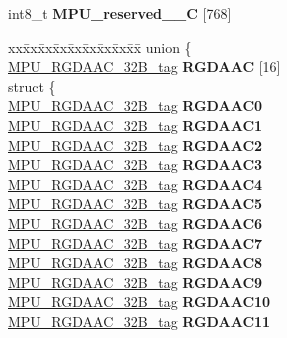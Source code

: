 \begin{DoxyCompactItemize}
\begin{tabbing}
\end{tabbing}\item 
\mbox{\label{structMPU__struct__tag_aca2bee17444b12c8c9af0d271b221dc4}} 
int8\+\_\+t {\bfseries M\+P\+U\+\_\+reserved\+\_\+\_\+C} \mbox{[}768\mbox{]}
\item 
\mbox{\label{structMPU__struct__tag_ac384567c437a03ea11d9fd11b6be2d35}} 
\begin{tabbing}
xx\=xx\=xx\=xx\=xx\=xx\=xx\=xx\=xx\=\kill
union \{\\
\>\mbox{\hyperlink{unionMPU__RGDAAC__32B__tag}{MPU\_RGDAAC\_32B\_tag}} {\bfseries RGDAAC} \mbox{[}16\mbox{]}\\
\mbox{\label{unionMPU__struct__tag_1_1_0D2161_a2ce5774a099811513e0aeede938a7910}} 
\>struct \{\\
\>\>\mbox{\hyperlink{unionMPU__RGDAAC__32B__tag}{MPU\_RGDAAC\_32B\_tag}} {\bfseries RGDAAC0}\\
\>\>\mbox{\hyperlink{unionMPU__RGDAAC__32B__tag}{MPU\_RGDAAC\_32B\_tag}} {\bfseries RGDAAC1}\\
\>\>\mbox{\hyperlink{unionMPU__RGDAAC__32B__tag}{MPU\_RGDAAC\_32B\_tag}} {\bfseries RGDAAC2}\\
\>\>\mbox{\hyperlink{unionMPU__RGDAAC__32B__tag}{MPU\_RGDAAC\_32B\_tag}} {\bfseries RGDAAC3}\\
\>\>\mbox{\hyperlink{unionMPU__RGDAAC__32B__tag}{MPU\_RGDAAC\_32B\_tag}} {\bfseries RGDAAC4}\\
\>\>\mbox{\hyperlink{unionMPU__RGDAAC__32B__tag}{MPU\_RGDAAC\_32B\_tag}} {\bfseries RGDAAC5}\\
\>\>\mbox{\hyperlink{unionMPU__RGDAAC__32B__tag}{MPU\_RGDAAC\_32B\_tag}} {\bfseries RGDAAC6}\\
\>\>\mbox{\hyperlink{unionMPU__RGDAAC__32B__tag}{MPU\_RGDAAC\_32B\_tag}} {\bfseries RGDAAC7}\\
\>\>\mbox{\hyperlink{unionMPU__RGDAAC__32B__tag}{MPU\_RGDAAC\_32B\_tag}} {\bfseries RGDAAC8}\\
\>\>\mbox{\hyperlink{unionMPU__RGDAAC__32B__tag}{MPU\_RGDAAC\_32B\_tag}} {\bfseries RGDAAC9}\\
\>\>\mbox{\hyperlink{unionMPU__RGDAAC__32B__tag}{MPU\_RGDAAC\_32B\_tag}} {\bfseries RGDAAC10}\\
\>\>\mbox{\hyperlink{unionMPU__RGDAAC__32B__tag}{MPU\_RGDAAC\_32B\_tag}} {\bfseries RGDAAC11}\\

\end{tabbing}
\end{DoxyCompactItemize}
